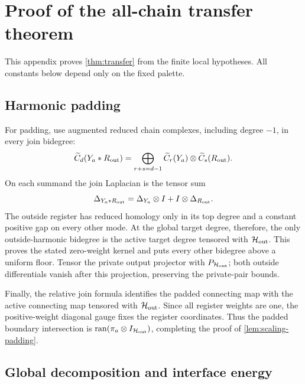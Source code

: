 \section{Proof of the all-chain transfer theorem}
\label{app:transfer-proof}

This appendix proves \cref{thm:transfer} from the finite local hypotheses. All constants below depend only on the fixed palette.

\subsection{Harmonic padding}
\label{app:local-padding}

For padding, use augmented reduced chain complexes, including degree \(-1\),
in every join bidegree:
\[
\widetilde C_d(Y_a*R_{\rm out})
=\bigoplus_{r+s=d-1}
\widetilde C_r(Y_a)\otimes\widetilde C_s(R_{\rm out}).
\]
On each summand the join Laplacian is the tensor sum
\[
\Delta_{Y_a*R_{\rm out}}
=\Delta_{Y_a}\otimes I+I\otimes\Delta_{R_{\rm out}}.
\]
The outside register has reduced homology only in its top degree and a
constant positive gap on every other mode.  At the global target degree,
therefore, the only outside-harmonic bidegree is the active target degree
tensored with \(\mathcal{H}_{\rm out}\).  This proves the stated zero-weight kernel
and puts every other bidegree above a uniform floor.  Tensor the private
output projector with \(P_{\mathcal{H}_{\rm out}}\); both outside differentials vanish
after this projection, preserving the private-pair bounds.

Finally, the relative join formula identifies the padded connecting map with
the active connecting map tensored with
\(\mathcal{H}_{\rm out}\).  Since all register weights are one, the positive-weight
diagonal gauge fixes the register coordinates.  Thus the padded boundary
intersection is \(\operatorname{ran}(\pi_a\otimes I_{\mathcal{H}_{\rm out}})\), completing the proof
of \cref{lem:scaling-padding}.

\subsection{Global decomposition and interface energy}

